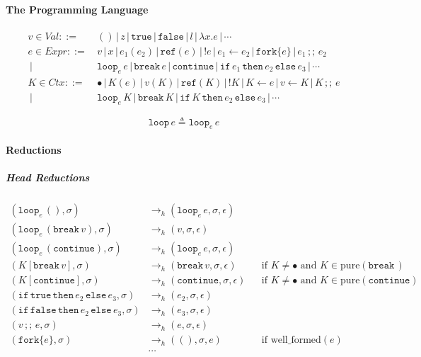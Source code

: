 \documentclass{article}
\numberwithin{algorithm}{section}
\newcommand{\true}{\texttt{true}}
\newcommand{\false}{\texttt{false}}
\newcommand{\cref}{\texttt{ref}}
\newcommand{\cfork}[1]{\texttt{fork}\{#1\}}
\newcommand{\cloop}[1]{\texttt{loop}_{#1}\,}
\newcommand{\cbreak}{\texttt{break}\,}
\newcommand{\ccontinue}{\texttt{continue}}
\newcommand{\cif}{\texttt{if}\,}
\newcommand{\cthen}{\,\texttt{then}\,}
\newcommand{\celse}{\,\texttt{else}\,}
\newcommand{\cseq}{\,;;\,}
\newcommand{\pure}[1]{\text{pure}(#1)}
\newcommand{\wellf}[1]{\text{well\_formed}(#1)}
\newcommand{\hred}{\rightarrow_h}
\newcommand{\sep}{\,|\,}
\begin{document}
\paragraph{The Programming Language}

$$
\begin{aligned}
    v \in \textit{Val} ::=\, & () \sep z \sep \true \sep \false \sep l \sep \lambda x.e \sep \cdots \\
    e \in \textit{Expr} ::=\, & v \sep x \sep e_1(e_2) \sep \cref(e) \sep !e \sep e_1 \leftarrow e_2 \sep \cfork{e} \sep e_1 \cseq e_2 \\
                        \sep\, & \cloop{e} e \sep \cbreak e \sep \ccontinue \sep \cif e_1 \cthen e_2 \celse e_3 \sep \cdots \\
    K \in \textit{Ctx} ::=\, & \bullet \sep K(e) \sep v(K) \sep \cref(K) \sep !K \sep K \leftarrow e \sep v \leftarrow K \sep K \cseq e \\
                        \sep\, & \cloop{e} K \sep \cbreak K \sep \cif K \cthen e_2 \celse e_3 \sep \cdots
\end{aligned}
$$

$$
\texttt{loop}\, e \triangleq \cloop{e} e
$$

\paragraph{Reductions}

\subparagraph{Head Reductions}

$$
\begin{aligned}
    (\cloop{e} (), \sigma) &\hred (\cloop{e} e, \sigma, \epsilon) && \\
    (\cloop{e} (\cbreak v), \sigma) &\hred (v, \sigma, \epsilon) && \\
    (\cloop{e} (\ccontinue), \sigma) &\hred (\cloop{e} e, \sigma, \epsilon) &&  \\
    (K[\cbreak v], \sigma) &\hred (\cbreak v, \sigma, \epsilon) && \text{if } K \neq \bullet \text{ and } K \in \pure{\cbreak\!} \\
    (K[\ccontinue], \sigma) &\hred (\ccontinue, \sigma, \epsilon) && \text{if } K \neq \bullet \text{ and } K \in \pure{\ccontinue} \\
    (\cif \true \cthen e_2 \celse e_3, \sigma) &\hred (e_2, \sigma, \epsilon) && \\
    (\cif \false \cthen e_2 \celse e_3, \sigma) &\hred (e_3, \sigma, \epsilon) && \\
    (v \cseq e, \sigma) &\hred (e, \sigma, \epsilon) && \\
    (\cfork{e}, \sigma) &\hred ((), \sigma, e) && \text{if } \wellf{e} \\
    &\cdots
\end{aligned}
$$
\end{document}
